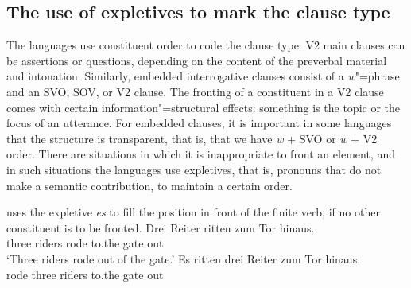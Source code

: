 \subsection{The use of expletives to mark the clause type}
\label{sec-phen-use-of-expletives}

\largerpage
The  languages use constituent order to code the clause type: V2 main clauses can be
assertions or questions, depending on the content of the preverbal material and
intonation. Similarly, embedded interrogative clauses consist of a \emph{w}"=phrase and an SVO, SOV,
or V2 clause. The fronting of a constituent in a V2 clause comes with certain information"=structural
effects: something is the topic or the focus of an utterance. For embedded clauses, it is important
in some languages that the structure is transparent, that is, that we have \emph{w} + SVO or
\emph{w} + V2 order. There are situations in which it is inappropriate to front an element, and in
such situations the  languages use expletives, that is, pronouns that do not make a semantic
contribution, to maintain a certain order.

 uses the expletive \emph{es} to fill the position in front of the finite verb, if no other
constituent is to be fronted.
\eal
\ex 
\gll Drei Reiter ritten zum Tor hinaus.\\
     three riders rode  to.the gate out\\\german
\glt `Three riders rode out of the gate.'
\ex 
\gll Es ritten drei Reiter zum Tor hinaus.\\
     \expl{} rode   three riders to.the gate out\\
\zl

